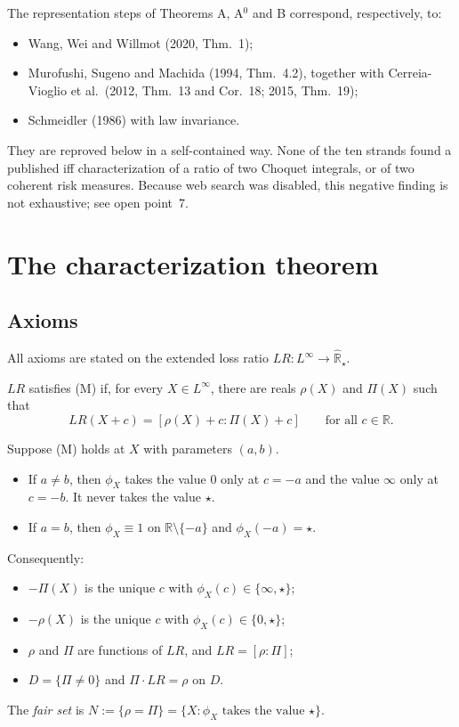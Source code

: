 The representation steps of Theorems A, A$^0$ and B correspond, respectively, to:
\begin{itemize}
\item Wang, Wei and Willmot (2020, Thm.~1);
\item Murofushi, Sugeno and Machida (1994, Thm.~4.2), together with Cerreia-Vioglio et al.\ (2012, Thm.~13 and Cor.~18; 2015, Thm.~19);
\item Schmeidler (1986) with law invariance.
\end{itemize}
They are reproved below in a self-contained way. None of the ten strands found a published iff characterization of a ratio of two Choquet integrals, or of two coherent risk measures. Because web search was disabled, this negative finding is not exhaustive; see open point~7.

\section{The characterization theorem}

\subsection{Axioms}

All axioms are stated on the extended loss ratio $LR:L^\infty\to\widehat{\mathbb R}_\star$.

\begin{definition}
$LR$ satisfies (M) if, for every $X\in L^\infty$, there are reals $\rho(X)$ and $\Pi(X)$ such that
\[
LR(X+c)=[\rho(X)+c:\Pi(X)+c]\qquad\text{for all }c\in\mathbb R .
\]
\end{definition}

\begin{lemma}
Suppose (M) holds at $X$ with parameters $(a,b)$.
\begin{itemize}
\item If $a\neq b$, then $\phi_X$ takes the value $0$ only at $c=-a$ and the value $\infty$ only at $c=-b$. It never takes the value $\star$.
\item If $a=b$, then $\phi_X\equiv 1$ on $\mathbb R\setminus\{-a\}$ and $\phi_X(-a)=\star$.
\end{itemize}
Consequently:
\begin{itemize}
\item $-\Pi(X)$ is the unique $c$ with $\phi_X(c)\in\{\infty,\star\}$;
\item $-\rho(X)$ is the unique $c$ with $\phi_X(c)\in\{0,\star\}$;
\item $\rho$ and $\Pi$ are functions of $LR$, and $LR=[\rho:\Pi]$;
\item $D=\{\Pi\neq 0\}$ and $\Pi\cdot LR=\rho$ on $D$.
\end{itemize}
The \emph{fair set} is $N:=\{\rho=\Pi\}=\{X:\phi_X\text{ takes the value }\star\}$.
\end{lemma}

